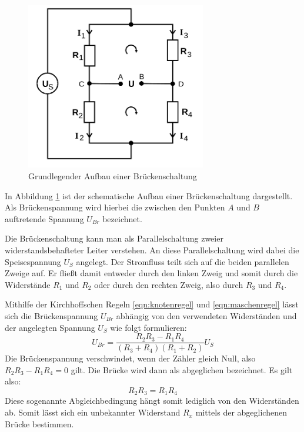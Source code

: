 \begin{figure}
  \centering
  \includegraphics[width=0.7\textwidth]{Bilder/brueckenschaltungallgemein.png}
  \caption{Grundlegender Aufbau einer Brückenschaltung \cite{Anleitung}}
  \label{fig:brückenschaltung}
\end{figure}
In Abbildung \ref{fig:brückenschaltung} ist der schematische Aufbau einer Brückenschaltung dargestellt.
Als Brückenspannung wird hierbei die zwischen den Punkten $A$ und $B$ auftretende Spannung $U_{Br}$ bezeichnet.

Die Brückenschaltung kann man als Parallelschaltung zweier widerstandsbehafteter Leiter verstehen. An diese Parallelschaltung wird dabei die Speisespannung $U_S$ angelegt.
Der Stromfluss teilt sich auf die beiden parallelen Zweige auf. Er fließt damit entweder durch den linken Zweig und somit durch die Widerstände $R_1$ und $R_2$ oder durch den rechten Zweig, also durch $R_3$ und $R_4$.

Mithilfe der Kirchhoffschen Regeln \eqref{eqn:knotenregel} und \eqref{eqn:maschenregel} lässt sich die Brückenspannung $U_{Br}$ abhängig von den verwendeten Widerständen und der angelegten Spannung $U_S$ wie folgt formulieren:
\begin{equation}
  \label{eqn:brückeeingang}
U_{Br}=\frac{R_2R_3-R_1R_4}{(R_3+R_4)(R_1+R_2)}U_S
\end{equation}
Die Brückenspannung verschwindet, wenn der Zähler gleich Null, also $R_2R_3-R_1R_4=0$ gilt.
Die Brücke wird dann als abgeglichen bezeichnet. Es gilt also:
\begin{equation}
R_2R_3=R_1R_4
\label{eqn:abgleichbedingung}
\end{equation}
Diese sogenannte Abgleichbedingung hängt somit lediglich von den Widerständen ab. Somit lässt sich ein unbekannter Widerstand $R_x$ mittels der abgeglichenen Brücke bestimmen.

